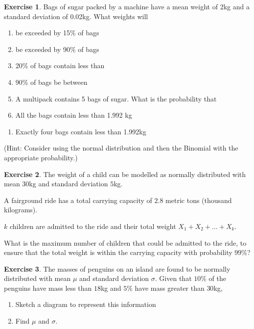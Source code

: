 \documentclass[
]{book}
\providecommand{\tightlist}{%
  \setlength{\itemsep}{0pt}\setlength{\parskip}{0pt}}
\theoremstyle{definition}
\theoremstyle{definition}
\theoremstyle{definition}
\newtheorem{exercise}{Exercise}[chapter]
\theoremstyle{definition}
\theoremstyle{remark}
\begin{document}
\begin{exercise}
Bags of sugar packed by a machine have a mean weight of 2kg and a standard
deviation of 0.02kg. What weights will

\begin{enumerate}
\def\labelenumi{\alph{enumi})}
\item
  be exceeded by 15\% of bags
\item
  be exceeded by 90\% of bags
\item
  20\% of bags contain less than
\item
  90\% of bags be between
\item
  A multipack contains 5 bags of sugar. What is the probability that
\item
  All the bags contain less than 1.992 kg
\end{enumerate}

\begin{enumerate}
\def\labelenumi{\roman{enumi})}
\setcounter{enumi}{1}
\tightlist
\item
  Exactly four bags contain less than 1.992kg
\end{enumerate}

(Hint: Consider using the normal distribution and then the Binomial
with the appropriate probability.)
\end{exercise}

\begin{exercise}
The weight of a child can be modelled as normally distributed with mean \(30\)kg and standard deviation \(5\)kg.

A fairground ride has a total carrying capacity of \(2.8\) metric tons (thousand kilograms).

\(k\) children are admitted to the ride and their total weight \(X_1+X_2+ \ldots + X_k\).

What is the maximum number of children that could be admitted to the ride, to ensure that the total weight is within the carrying capacity with probability \(99\%\)?
\end{exercise}

\begin{exercise}

The masses of penguins on an island are found to be normally distributed with mean \(\mu\) and standard deviation \(\sigma\). Given that \(10\%\) of the penguins have mass less than \(18\)kg and \(5\%\) have mass greater than \(30\)kg,

\begin{enumerate}
\def\labelenumi{\alph{enumi})}
\item
  Sketch a diagram to represent this information
\item
  Find \(\mu\) and \(\sigma\).
\end{enumerate}

\end{exercise}
\end{document}
